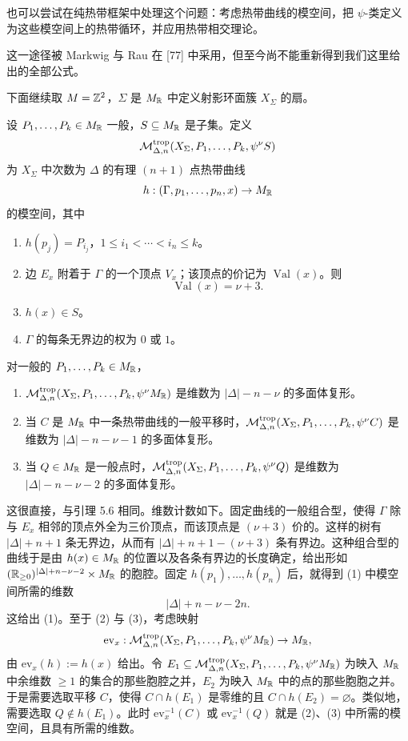 也可以尝试在纯热带框架中处理这个问题：考虑热带曲线的模空间，把 $\psi$-类定义为这些模空间上的热带循环，并应用热带相交理论。

这一途径被 Markwig 与 Rau 在 [77] 中采用，但至今尚不能重新得到我们这里给出的全部公式。

下面继续取 $M=\mathbb{Z}^2$，$\Sigma$ 是 $M_{\mathbb{R}}$ 中定义射影环面簇 $X_\Sigma$ 的扇。

\begin{definition}
设 $P_1,\ldots,P_k\in M_{\mathbb{R}}$ 一般，$S\subseteq M_{\mathbb{R}}$ 是子集。定义
\[
  \mathcal{M}^{\mathrm{trop}}_{\Delta,n}(X_\Sigma,P_1,\ldots,P_k,\psi^\nu S)
\]
为 $X_\Sigma$ 中次数为 $\Delta$ 的有理 $(n+1)$ 点热带曲线
\[
  h:(\Gamma,p_1,\ldots,p_n,x)\to M_{\mathbb{R}}
\]
的模空间，其中
\begin{enumerate}[label=(\arabic*),leftmargin=2.2em,itemsep=1pt]
\item $h(p_j)=P_{i_j}$，$1\le i_1<\cdots<i_n\le k$。
\item 边 $E_x$ 附着于 $\Gamma$ 的一个顶点 $V_x$；该顶点的价记为 $\operatorname{Val}(x)$。则
  \[
    \operatorname{Val}(x)=\nu+3.
  \]
\item $h(x)\in S$。
\item $\Gamma$ 的每条无界边的权为 $0$ 或 $1$。
\end{enumerate}
\end{definition}

\begin{lemma}
对一般的 $P_1,\ldots,P_k\in M_{\mathbb{R}}$，
\begin{enumerate}[label=(\arabic*),leftmargin=2.2em,itemsep=1pt]
\item $\mathcal{M}^{\mathrm{trop}}_{\Delta,n}(X_\Sigma,P_1,\ldots,P_k,\psi^\nu M_{\mathbb{R}})$ 是维数为 $|\Delta|-n-\nu$ 的多面体复形。
\item 当 $C$ 是 $M_{\mathbb{R}}$ 中一条热带曲线的一般平移时，$\mathcal{M}^{\mathrm{trop}}_{\Delta,n}(X_\Sigma,P_1,\ldots,P_k,\psi^\nu C)$ 是维数为 $|\Delta|-n-\nu-1$ 的多面体复形。
\item 当 $Q\in M_{\mathbb{R}}$ 是一般点时，$\mathcal{M}^{\mathrm{trop}}_{\Delta,n}(X_\Sigma,P_1,\ldots,P_k,\psi^\nu Q)$ 是维数为 $|\Delta|-n-\nu-2$ 的多面体复形。
\end{enumerate}
\end{lemma}

这很直接，与引理 5.6 相同。维数计数如下。固定曲线的一般组合型，使得 $\Gamma$ 除与 $E_x$ 相邻的顶点外全为三价顶点，而该顶点是 $(\nu+3)$ 价的。这样的树有 $|\Delta|+n+1$ 条无界边，从而有 $|\Delta|+n+1-(\nu+3)$ 条有界边。这种组合型的曲线于是由 $h(x)\in M_{\mathbb{R}}$ 的位置以及各条有界边的长度确定，给出形如 $(\mathbb{R}_{\ge0})^{|\Delta|+n-\nu-2}\times M_{\mathbb{R}}$ 的胞腔。固定 $h(p_1),\ldots,h(p_n)$ 后，就得到 (1) 中模空间所需的维数
\[
  |\Delta|+n-\nu-2n.
\]
这给出 (1)。至于 (2) 与 (3)，考虑映射
\[
  \mathrm{ev}_x:\mathcal{M}^{\mathrm{trop}}_{\Delta,n}(X_\Sigma,P_1,\ldots,P_k,\psi^\nu M_{\mathbb{R}})\to M_{\mathbb{R}},
\]
由 $\mathrm{ev}_x(h):=h(x)$ 给出。令 $E_1\subseteq\mathcal{M}^{\mathrm{trop}}_{\Delta,n}(X_\Sigma,P_1,\ldots,P_k,\psi^\nu M_{\mathbb{R}})$ 为映入 $M_{\mathbb{R}}$ 中余维数 $\ge1$ 的集合的那些胞腔之并，$E_2$ 为映入 $M_{\mathbb{R}}$ 中的点的那些胞胞之并。于是需要选取平移 $C$，使得 $C\cap h(E_1)$ 是零维的且 $C\cap h(E_2)=\varnothing$。类似地，需要选取 $Q\notin h(E_1)$。此时 $\mathrm{ev}_x^{-1}(C)$ 或 $\mathrm{ev}_x^{-1}(Q)$ 就是 (2)、(3) 中所需的模空间，且具有所需的维数。

